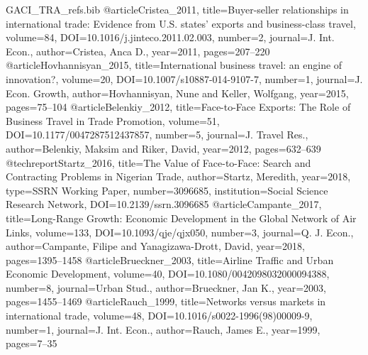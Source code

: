 \begin{filecontents*}[overwrite]{GACI_TRA_refs.bib}
@article{Cristea_2011, title={Buyer-seller relationships in international trade: Evidence from {U.S.} states' exports and business-class travel}, volume={84}, DOI={10.1016/j.jinteco.2011.02.003}, number={2}, journal={J. Int. Econ.}, author={Cristea, Anca D.}, year={2011}, pages={207--220} }
@article{Hovhannisyan_2015, title={International business travel: an engine of innovation?}, volume={20}, DOI={10.1007/s10887-014-9107-7}, number={1}, journal={J. Econ. Growth}, author={Hovhannisyan, Nune and Keller, Wolfgang}, year={2015}, pages={75--104} }
@article{Belenkiy_2012, title={Face-to-Face Exports: The Role of Business Travel in Trade Promotion}, volume={51}, DOI={10.1177/0047287512437857}, number={5}, journal={J. Travel Res.}, author={Belenkiy, Maksim and Riker, David}, year={2012}, pages={632--639} }
@techreport{Startz_2016, title={The Value of Face-to-Face: Search and Contracting Problems in {Nigerian} Trade}, author={Startz, Meredith}, year={2018}, type={SSRN Working Paper}, number={3096685}, institution={Social Science Research Network}, DOI={10.2139/ssrn.3096685} }
@article{Campante_2017, title={Long-Range Growth: Economic Development in the Global Network of Air Links}, volume={133}, DOI={10.1093/qje/qjx050}, number={3}, journal={Q. J. Econ.}, author={Campante, Filipe and Yanagizawa-Drott, David}, year={2018}, pages={1395--1458} }
@article{Brueckner_2003, title={Airline Traffic and Urban Economic Development}, volume={40}, DOI={10.1080/0042098032000094388}, number={8}, journal={Urban Stud.}, author={Brueckner, Jan K.}, year={2003}, pages={1455--1469} }
@article{Rauch_1999, title={Networks versus markets in international trade}, volume={48}, DOI={10.1016/s0022-1996(98)00009-9}, number={1}, journal={J. Int. Econ.}, author={Rauch, James E.}, year={1999}, pages={7--35} }

\end{filecontents*}
